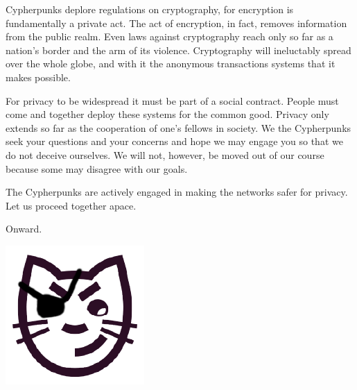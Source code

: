\documentclass[statementpaper,oneside,article,14pt]{memoir}
\begin{document}
Cypherpunks deplore regulations on cryptography, for encryption is fundamentally a private act. The act of encryption, in fact, removes information from the public realm. Even laws against cryptography reach only so far as a nation's border and the arm of its violence. Cryptography will ineluctably spread over the whole globe, and with it the anonymous transactions systems that it makes possible.

\newpage

For privacy to be widespread it must be part of a social contract. People must come and together deploy these systems for the common good. Privacy only extends so far as the cooperation of one's fellows in society. We the Cypherpunks seek your questions and your concerns and hope we may engage you so that we do not deceive ourselves. We will not, however, be moved out of our course because some may disagree with our goals.


The Cypherpunks are actively engaged in making the networks safer for privacy. Let us proceed together apace.

Onward. 




\newpage

\begin{center}
  \includegraphics[scale=.2]{katzenpost_logo} \\
\end{center}
\end{document}
